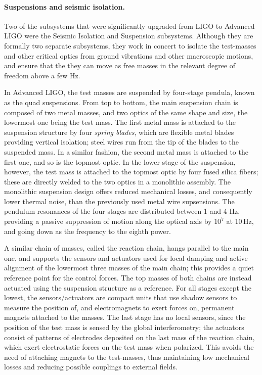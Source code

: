 \paragraph*{Suspensions and seismic isolation.}
Two of the subsystems that were significantly upgraded from LIGO to Advanced LIGO
were the Seismic Isolation and Suspension subsystems. Although they 
are formally two separate subsystems, they work in concert to isolate the test-masses and 
other critical optics from ground vibrations and other macroscopic motions, and ensure 
that the they can move as free masses in the relevant degree of freedom above a few Hz.

In Advanced LIGO, the test masses are suspended by four-stage pendula, known as the quad suspensions. 
From top to 
bottom, the main suspension chain is composed of two metal masses, and two optics 
of the same shape and size, the lowermost one being the test mass. The first metal mass 
is attached to the suspension structure by four \textit{spring blades}, which are flexible 
metal blades providing vertical isolation; steel wires run from the tip of the blades to the 
suspended mass. In a similar fashion, the second metal mass is attached to the first one, 
and so is the topmost optic. In the lower stage of the suspension, however, the test mass 
is attached to the topmost optic by four fused silica fibers; these are directly welded to 
the two optics in a monolithic assembly. The monolithic suspension design offers reduced mechanical losses, and
consequently lower thermal noise, than the previously used metal wire supsensions. 
The pendulum resonances of the four stages are 
distributed between 1 and 4 Hz, providing a passive suppression of motion along 
the optical axis by $10^7$ at 10\,Hz, and going down as the frequency to the eighth power.

A similar chain of masses, called the reaction chain, hangs parallel to the main one, 
and supports the sensors and actuators used for local damping and active alignment 
of the lowermost three masses of the main chain; this provides a quiet reference point 
for the control forces. The top masses of both chains are instead actuated using the 
suspension structure as a reference. For all stages except the lowest, the sensors/actuators 
are compact units that use shadow sensors to measure the position of, and 
electromagnets to exert forces on, permanent magnets attached to the masses. 
The last stage has no local sensors, since the position of the test mass is sensed 
by the global interferometry; the actuators consist of patterns of electrodes 
deposited on the last mass of the reaction chain, which exert electrostatic 
forces on the test mass when polarized. This avoids the need of 
attaching magnets to the test-masses, thus maintaining low mechanical 
losses and reducing possible couplings to external fields.

